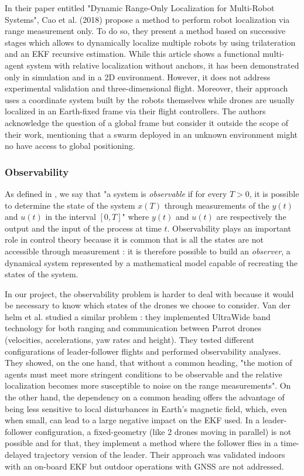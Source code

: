 In their paper entitled "Dynamic Range-Only Localization for Multi-Robot Systems", Cao et al. (2018) \parencite{cao_2018} propose a method to perform robot localization via range measurement only. To do so, they present a method based on successive stages which allows to dynamically localize multiple robots by using trilateration and an EKF recursive estimation. While this article shows a functional multi-agent system with relative localization without anchors, it has been demonstrated only in simulation and in a 2D environment. However, it does not address experimental validation and three-dimensional flight. Moreover, their approach uses a coordinate system built by the robots themselves while drones are usually localized in an Earth-fixed frame via their flight controllers. The authors acknowledge the question of a global frame but consider it outside the scope of their work, mentioning that a swarm deployed in an unknown environment might no have access to global positioning.

\subsubsection{Observability}

As defined in \parencite{astrom_2021}, we say that "a system is \textit{observable} if for every $T>0$, it is possible to determine the state of the system $x(T)$ through measurements of the $y(t)$ and $u(t)$ in the interval $[0,T]$" where $y(t)$ and $u(t)$ are respectively the output and the input of the process at time $t$. Observability plays an important role in control theory because it is common that is all the states are not accessible through measurement : it is therefore possible to build an \textit{observer}, a dynamical system represented by a mathematical model capable of recreating the states of the system. 

In our project, the observability problem is harder to deal with because it would be necessary to know which states of the drones we choose to consider. Van der helm et al. \parencite{van_der_helm_2020} studied a similar problem : they implemented UltraWide band technology for both ranging and communication between Parrot drones (velocities, accelerations, yaw rates and height). They tested different configurations of leader-follower flights and performed observability analyses. They showed, on the one hand, that without a common heading, "the motion
of agents must meet more stringent conditions to be observable and the relative localization becomes more susceptible to noise on the range measurements". On the other hand, the dependency on a common heading offers the advantage of being less sensitive to local disturbances in Earth's magnetic field, which, even when small, can lead to a large negative impact on the EKF used. In a leader-follower configuration, a fixed-geometry (like 2 drones moving in parallel) is not possible and for that, they implement a method where the follower flies in a time-delayed trajectory version of the leader. Their approach was validated indoors with an on-board EKF but outdoor operations with GNSS are not addressed.

